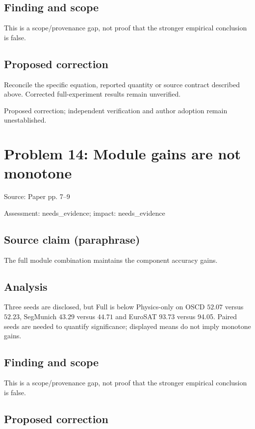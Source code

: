 \documentclass[11pt]{article}
\begin{document}
\subsection*{Finding and scope}

This is a scope/provenance gap, not proof that the stronger empirical conclusion is false.

\subsection*{Proposed correction}

Reconcile the specific equation, reported quantity or source contract described above. Corrected full-experiment results remain unverified.

Proposed correction; independent verification and author adoption remain unestablished.

\section*{Problem 14: Module gains are not monotone}

Source: Paper pp. 7–9

Assessment: needs\_evidence; impact: needs\_evidence

\subsection*{Source claim (paraphrase)}

The full module combination maintains the component accuracy gains.

\subsection*{Analysis}

Three seeds are disclosed, but Full is below Physics-only on OSCD \(52.07\) versus \(52.23\), SegMunich \(43.29\) versus \(44.71\) and EuroSAT \(93.73\) versus 94.05. Paired seeds are needed to quantify significance; displayed means do not imply monotone gains.

\subsection*{Finding and scope}

This is a scope/provenance gap, not proof that the stronger empirical conclusion is false.

\subsection*{Proposed correction}
\end{document}
